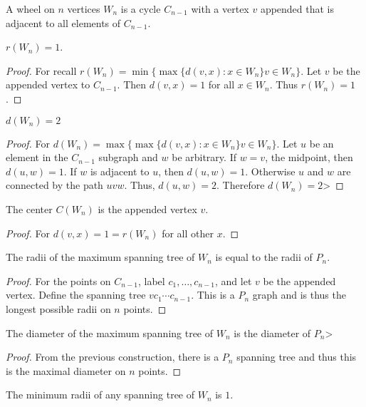 \documentclass[crop=false,class=book,oneside]{standalone}
\begin{document}
\begin{definition}
A wheel on $n$ vertices $W_n$ is a cycle $C_{n-1}$ with a vertex $v$ appended that is adjacent to all elements of $C_{n-1}$.
\end{definition}
\begin{corollary}
$r(W_n) = 1$.
\end{corollary}
\begin{proof}
For recall $r(W_n) = \min\{\max\{d(v,x):x\in W_n\}v\in W_n\}$. Let $v$ be the appended vertex to $C_{n-1}$. Then $d(v,x) = 1$ for all $x\in W_n$. Thus $r(W_n) = 1$.
\end{proof}
\begin{corollary}
$d(W_n) = 2$
\end{corollary}
\begin{proof}
For $d(W_n) = \max\{\max\{d(v,x):x\in W_n\}v\in W_n\}$. Let $u$ be an element in the $C_{n-1}$ subgraph and $w$ be arbitrary. If $w= v$, the midpoint, then $d(u,w) = 1$. If $w$ is adjacent to $u$, then $d(u,w) = 1$. Otherwise $u$ and $w$ are connected by the path $uvw$. Thus, $d(u,w) = 2$. Therefore $d(W_n) = 2$>
\end{proof}
\begin{corollary}
The center $C(W_n)$ is the appended vertex $v$.
\end{corollary}
\begin{proof}
For $d(v,x) = 1 = r(W_n)$ for all other $x$.
\end{proof}
\begin{corollary}
The radii of the maximum spanning tree of $W_n$ is equal to the radii of $P_n$.
\end{corollary}
\begin{proof}
For the points on $C_{n-1}$, label $c_1,\hdots, c_{n-1}$, and let $v$ be the appended vertex. Define the spanning tree $vc_1\cdots c_{n-1}$. This is a $P_n$ graph and is thus the longest possible radii on $n$ points.
\end{proof}
\begin{corollary}
The diameter of the maximum spanning tree of $W_n$ is the diameter of $P_n$>
\end{corollary}
\begin{proof}
From the previous construction, there is a $P_n$ spanning tree and thus this is the maximal diameter on $n$ points.
\end{proof}
\begin{corollary}
The minimum radii of any spanning tree of $W_n$ is $1$.
\end{corollary}
\end{document}
